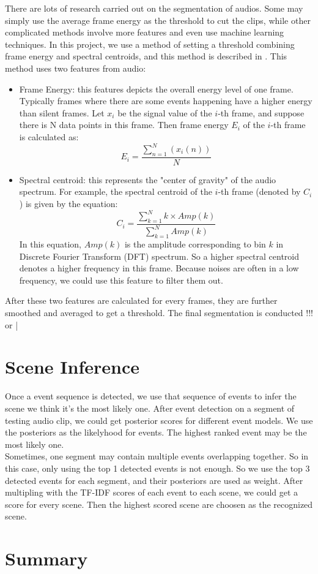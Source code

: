 There are lots of research carried out on the segmentation of audios.
Some may simply use the average frame energy as the threshold to cut the clips, while other complicated methods involve more features and even use machine learning techniques. 
In this project, we use a method of setting a threshold combining frame energy and spectral centroids, and this method is described in \cite{giannakopoulos2009method}.
This method uses two features from audio:
\begin{itemize}
\item{Frame Energy: this features depicts the overall energy level of one frame. 
Typically frames where there are some events happening have a higher energy than silent frames.
Let $x_i$ be the signal value of the $i$-th frame, and suppose there is N data points in this frame. 
Then frame energy $E_i$ of the $i$-th frame is calculated as:  
\begin{equation}
E_i = \frac{\sum\limits_{n=1}^N(x_i(n))}{N}
\end{equation}
}
\item{Spectral centroid: this represents the "center of gravity" of the audio spectrum. For example, the spectral centroid of the $i$-th frame (denoted by $ C_i$) is given by the equation:
\begin{equation}
C_i = \frac{\sum\limits_{k=1}^Nk\times Amp(k)}{\sum\limits_{k=1}^NAmp(k)}
\end{equation}
In this equation, $Amp(k)$ is the amplitude corresponding to bin $k$ in Discrete Fourier Transform (DFT) spectrum. 
So a higher spectral centroid denotes a higher frequency in this frame. Because noises are often in a low frequency, we could use this feature to filter them out. 
}
\end{itemize}

After these two features are calculated for every frames, they are further smoothed and averaged to get a threshold. 
The final segmentation is conducted 
!!!  or | 

\section{Scene Inference}
Once a event sequence is detected, we use that sequence of events to infer the scene we think it's the most likely one. 
After event detection on a segment of testing audio clip, we could get posterior scores for different event models. 
We use the posteriors as the likelyhood for events. The highest ranked event may be the most likely one. \\ 

Sometimes, one segment may contain multiple events overlapping together. 
So in this case, only using the top 1 detected events is not enough. 
So we use the top 3 detected events for each segment, and their posteriors are used as weight. 
After multipling with the TF-IDF scores of each event to each scene, we could get a score for every scene. 
Then the highest scored scene are choosen as the recognized scene. 

\section{Summary}

